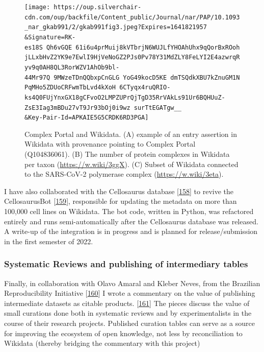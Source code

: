 \begin{figure}
\hypertarget{fig:complexportal}{%
\centering
\texttt{[image: https://oup.silverchair-cdn.com/oup/backfile/Content\_public/Journal/nar/PAP/10.1093\_nar\_gkab991/2/gkab991fig3.jpeg?Expires=1641821957\\\&Signature=RK-es18S~Qh6vGQE~61i6u4prMuij8kVTbrjN6WUJLfYHOAhUhx9qQorBxROohjLLxbHvZ2YK9e7EwlI9HjVeNoGZ2PJs0Pv78Y31MdZLY8FeLYI2E4azwrqRyv9q0AH8QL3RorWZV1AhOb9bl-44Mr97Q~9MWzeTDnQQbxpCnGLG~YoG49kocD5KE~dmTSQdkXBU7kZnuGM1NPqMHo5ZDUoCRFwmTbLvd4kXoH~6CTyqx4ruQRIO-ks4Q0FUjYnxGX18gCFvoO2LMPZUPrQjTgD35RrVAkLs91Ur6BQHUuZ-ZsE3Iag3mBDu27vT9Jr93bOj0i9wz~surTtEGATgw\_\_\\\&Key-Pair-Id=APKAIE5G5CRDK6RD3PGA]}
\caption{Complex Portal and Wikidata. (A) example of an entry assertion in Wikidata with provenance pointing to Complex Portal (Q104836061). (B) The number of protein complexes in Wikidata per taxon (\url{https://w.wiki/3ggX}). (C) Subset of Wikidata connected to the SARS-CoV-2 polymerase complex (\url{https://w.wiki/3eta}).}\label{fig:complexportal}
}
\end{figure}

I have also collaborated with the Cellosaurus database {[}\protect\hyperlink{ref-1DguATd9G}{158}{]} to revive the CellosaurusBot {[}\protect\hyperlink{ref-lMQxhx3q}{159}{]}, responsible for updating the metadata on more than 100,000 cell lines on Wikidata. The bot code, written in Python, was refactored entirely and runs semi-automatically after the Cellosaurus database was released. A write-up of the integration is in progress and is planned for release/submission in the first semester of 2022.

\hypertarget{systematic-reviews-and-publishing-of-intermediary-tables}{%
\subsubsection{Systematic Reviews and publishing of intermediary tables}\label{systematic-reviews-and-publishing-of-intermediary-tables}}

Finally, in collaboration with Olavo Amaral and Kleber Neves, from the Brazilian Reproducibility Initiative {[}\protect\hyperlink{ref-F2mYjDJ0}{160}{]} I wrote a commentary on the value of publishing intermediate datasets as citable products. {[}\protect\hyperlink{ref-oXMFSv5v}{161}{]}
The pieces discuss the value of small curations done both in systematic reviews and by experimentalists in the course of their research projects. Published curation tables can serve as a source for improving the ecosystem of open knowledge, not less by reconciliation to Wikidata (thereby bridging the commentary with this project)

